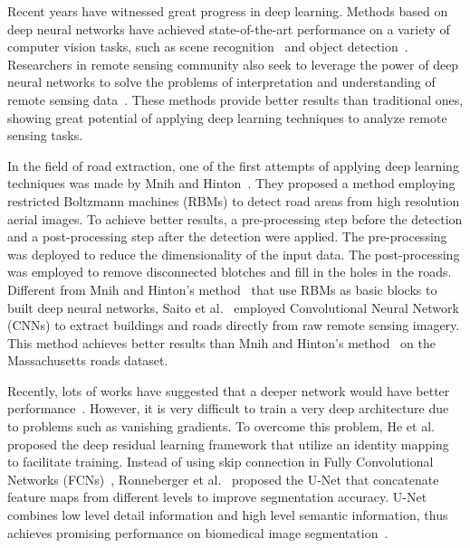 \documentclass[journal]{IEEEtran}
\begin{document}
Recent years have witnessed great progress in deep learning. Methods based on deep neural networks have achieved state-of-the-art performance on a variety of computer vision tasks, such as scene recognition~\cite{Zhou2014Learning} and object detection~\cite{Ren2017Faster}. Researchers in remote sensing community also seek to leverage the power of deep neural networks to solve the problems of interpretation and understanding of remote sensing data~\cite{mnih2010learning,mnih2012learning,zhang2016cnn,Saito2016Multiple,Zhang2016Deep,zhang2016functional}. These methods provide better results than traditional ones, showing great potential of applying deep learning techniques to analyze remote sensing tasks.

In the field of road extraction, one of the first attempts of applying deep learning techniques was made by Mnih and Hinton~\cite{mnih2010learning}. They proposed a method employing restricted Boltzmann machines (RBMs) to detect road areas from high resolution aerial images. To achieve better results, a pre-processing step before the detection and a post-processing step after the detection were applied. The pre-processing was deployed to reduce the dimensionality of the input data. The post-processing was employed to remove disconnected blotches and fill in the holes in the roads. Different from Mnih and Hinton's method~\cite{mnih2010learning} that use RBMs as basic blocks to built deep neural networks, Saito et al.~\cite{Saito2016Multiple} employed Convolutional Neural Network (CNNs) to extract buildings and roads directly from raw remote sensing imagery. This method achieves better results than Mnih and Hinton's method~\cite{mnih2010learning} on the Massachusetts roads dataset.

Recently, lots of works have suggested that a deeper network would have better performance~\cite{szegedy2015going,simonyan2014very}. However, it is very difficult to train a very deep architecture due to problems such as vanishing gradients. To overcome this problem, He et al.~\cite{resnet2015deep} proposed the deep residual learning framework that utilize an identity mapping~\cite{resnet2016} to facilitate  training. Instead of using skip connection in Fully Convolutional Networks (FCNs)~\cite{FCN2015fully}, Ronneberger et al.~\cite{U-NET2015} proposed the U-Net that concatenate  feature maps from different levels to improve segmentation accuracy. U-Net combines low level detail information and high level semantic information, thus achieves promising performance on biomedical image segmentation~\cite{U-NET2015}. 
\end{document}
